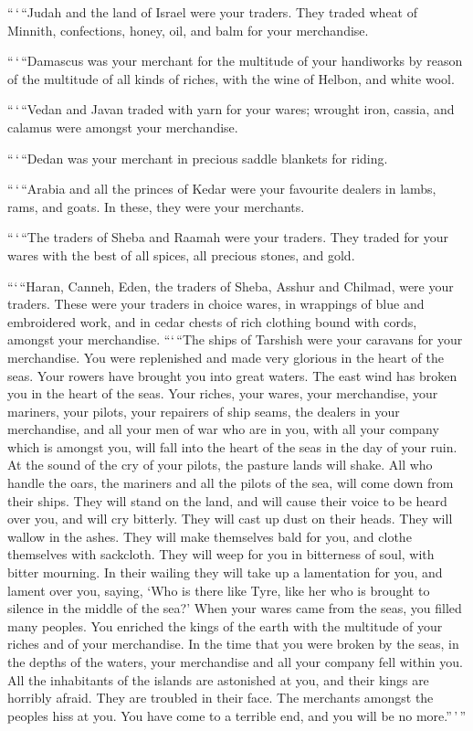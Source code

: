  ``\,`\,``Judah and the land of Israel were your traders.
They traded wheat of Minnith, confections, honey, oil, and balm for your
merchandise.

 ``\,`\,``Damascus was your merchant for the multitude of
your handiworks by reason of the multitude of all kinds of riches, with
the wine of Helbon, and white wool.

 ``\,`\,``Vedan and Javan traded with yarn for your wares;
wrought iron, cassia, and calamus were amongst your merchandise.

 ``\,`\,``Dedan was your merchant in precious saddle
blankets for riding.

 ``\,`\,``Arabia and all the princes of Kedar were your
favourite dealers in lambs, rams, and goats. In these, they were your
merchants.

 ``\,`\,``The traders of Sheba and Raamah were your
traders. They traded for your wares with the best of all spices, all
precious stones, and gold.

 ```\,``Haran, Canneh, Eden, the traders of Sheba, Asshur
and Chilmad, were your traders.  These were your traders in
choice wares, in wrappings of blue and embroidered work, and in cedar
chests of rich clothing bound with cords, amongst your merchandise.
 ```\,``The ships of Tarshish were your caravans for your
merchandise. You were replenished and made very glorious in the heart of
the seas.  Your rowers have brought you into great waters.
The east wind has broken you in the heart of the seas. 
Your riches, your wares, your merchandise, your mariners, your pilots,
your repairers of ship seams, the dealers in your merchandise, and all
your men of war who are in you, with all your company which is amongst
you, will fall into the heart of the seas in the day of your ruin.
 At the sound of the cry of your pilots, the pasture lands
will shake.  All who handle the oars, the mariners and all
the pilots of the sea, will come down from their ships. They will stand
on the land,  and will cause their voice to be heard over
you, and will cry bitterly. They will cast up dust on their heads. They
will wallow in the ashes.  They will make themselves bald
for you, and clothe themselves with sackcloth. They will weep for you in
bitterness of soul, with bitter mourning.  In their wailing
they will take up a lamentation for you, and lament over you, saying,
`Who is there like Tyre, like her who is brought to silence in the
middle of the sea?'  When your wares came from the seas,
you filled many peoples. You enriched the kings of the earth with the
multitude of your riches and of your merchandise.  In the
time that you were broken by the seas, in the depths of the waters, your
merchandise and all your company fell within you.  All the
inhabitants of the islands are astonished at you, and their kings are
horribly afraid. They are troubled in their face.  The
merchants amongst the peoples hiss at you. You have come to a terrible
end, and you will be no more.''\,'\,''

